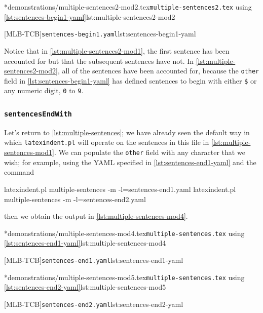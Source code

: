 	\begin{minipage}{.55\linewidth}
		\cmhlistingsfromfile*[showspaces=false]*{demonstrations/multiple-sentences2-mod2.tex}{\texttt{multiple-sentences2.tex} using \cref{lst:sentences-begin1-yaml}}{lst:multiple-sentences2-mod2}
	\end{minipage}
	\hfill
	\begin{minipage}{.45\linewidth}
		[MLB-TCB]{\texttt{sentences-begin1.yaml}}{lst:sentences-begin1-yaml}
	\end{minipage}
	Notice that in \cref{lst:multiple-sentences2-mod1}, the first sentence has been accounted for but that the subsequent sentences
	have not. In \cref{lst:multiple-sentences2-mod2}, all of the sentences have been accounted for, because the \texttt{other} field
	in \cref{lst:sentences-begin1-yaml} has defined sentences to begin with either \lstinline!$! or any numeric digit, \texttt{0} to \texttt{9}.

\subsubsection{\texttt{sentencesEndWith}}
	Let's return to \vref{lst:multiple-sentences}; we have already seen the default way in which \texttt{latexindent.pl} will operate on the
	sentences in this file in \vref{lst:multiple-sentences-mod1}. We can populate the \texttt{other} field with any character that we wish;
	for example, using the YAML specified in \cref{lst:sentences-end1-yaml} and the command
	\begin{commandshell}
latexindent.pl multiple-sentences -m -l=sentences-end1.yaml
latexindent.pl multiple-sentences -m -l=sentences-end2.yaml
\end{commandshell}
	then we obtain the output in \cref{lst:multiple-sentences-mod4}.

	\begin{minipage}{.5\linewidth}
		\cmhlistingsfromfile*[showspaces=false]*{demonstrations/multiple-sentences-mod4.tex}{\texttt{multiple-sentences.tex} using \cref{lst:sentences-end1-yaml}}{lst:multiple-sentences-mod4}
	\end{minipage}
	\hfill
	\begin{minipage}{.5\linewidth}
		[MLB-TCB]{\texttt{sentences-end1.yaml}}{lst:sentences-end1-yaml}
	\end{minipage}

	\begin{minipage}{.5\linewidth}
		\cmhlistingsfromfile*[showspaces=false]*{demonstrations/multiple-sentences-mod5.tex}{\texttt{multiple-sentences.tex} using \cref{lst:sentences-end2-yaml}}{lst:multiple-sentences-mod5}
	\end{minipage}
	\hfill
	\begin{minipage}{.5\linewidth}
		[MLB-TCB]{\texttt{sentences-end2.yaml}}{lst:sentences-end2-yaml}
	\end{minipage}

